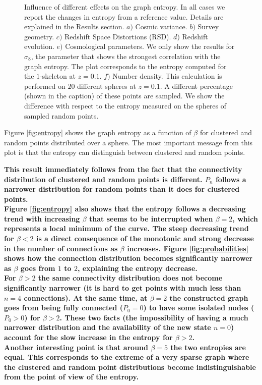 \documentclass[fleqn,usenatbib]{mnras}
\begin{document}
\begin{figure}
    \caption{Influence of different effects on the graph entropy. In all cases we 
    report the changes in entropy from a reference value. 
    Details are explained in the Results section. $a)$ Cosmic variance. 
    $b)$ Survey geometry. 
    $c)$ Redshift Space Distortions (RSD).
    $d)$ Redshift evolution.
    $e)$ Cosmological parameters. We only show the results for $\sigma_8$, 
    the parameter that shows the strongest correlation with the graph entropy.
    The plot corresponds to the entropy computed for the $1$-skeleton at $z=0.1$. 
    $f)$ Number density. 
    This calculation is performed on $20$ different spheres at $z=0.1$.
    A different percentage (shown in the caption) of these points are sampled. 
    We show the difference with respect to the entropy measured on the spheres 
    of sampled random points.\label{fig:diferencias}}
\end{figure}    


Figure \ref{fig:entropy} shows the graph entropy as a function of $\beta$ for
clustered and random points distributed over a sphere.
The most important message from this plot is that the entropy can distinguish between
clustered and random points.

\textbf{This result immediately follows from the fact that the connectivity distribution of clustered and random points is different. 
$P_n$ follows a narrower distribution for random points than it does for clustered points.\\
\indent
Figure \ref{fig:entropy} also shows that the entropy follows a decreasing trend with increasing $\beta$ that seems to be interrupted when $\beta=2$, which represents a local minimum of the curve.
The steep decreasing trend for $\beta<2$ is a direct consequence of the monotonic and strong decrease in the number of connections as $\beta$ increases.
Figure \ref{fig:probabilities} shows how the connection distribution becomes significantly narrower as $\beta$ goes from $1$ to $2$, explaining the entropy decrease.\\
\indent
For $\beta>2$ the same connectivity distribution does not become significantly narrower (it is hard to get points with much less than $n=4$ connections).
At the same time, at $\beta=2$ the constructed graph goes from
being fully connected ($P_0=0$) to have some isolated nodes ($P_0>0$) for $\beta>2$.
These two facts (the impossibility of having a much narrower distribution and the availability of the new state $n=0$) account for the slow increase in the entropy for $\beta>2$.\\
\indent
Another interesting point is that around $\beta=5$ the two entropies
are equal.  
This corresponds to the extreme of a very sparse graph where the
clustered and random point distributions become indistinguishable from the point of view of the entropy. 
}
\end{document}
